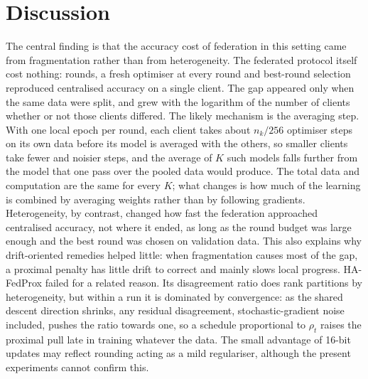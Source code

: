 \section{Discussion}

The central finding is that the accuracy cost of federation in this setting came from fragmentation rather than from
heterogeneity. The federated protocol itself cost nothing: rounds, a fresh optimiser at every round and best-round
selection reproduced centralised accuracy on a single client. The gap appeared only when the same data were split, and
grew with the logarithm of the number of clients whether or not those clients differed. The likely mechanism is the
averaging step. With one local epoch per round, each client takes about $n_k/256$ optimiser steps on its own data
before its model is averaged with the others, so smaller clients take fewer and noisier steps, and the average of $K$
such models falls further from the model that one pass over the pooled data would produce. The total data and
computation are the same for every $K$; what changes is how much of the learning is combined by averaging weights
rather than by following gradients. Heterogeneity, by contrast, changed how fast the federation approached centralised
accuracy, not where it ended, as long as the round budget was large enough and the best round was chosen on
validation data. This also explains why drift-oriented remedies helped little: when fragmentation causes most of the
gap, a proximal penalty has little drift to correct and mainly slows local progress. HA-FedProx failed for a related
reason. Its disagreement ratio does rank partitions by heterogeneity, but within a run it is dominated by convergence:
as the shared descent direction shrinks, any residual disagreement, stochastic-gradient noise included, pushes the ratio
towards one, so a schedule proportional to $\rho_t$ raises the proximal pull late in training whatever the data. The
small advantage of 16-bit updates may reflect rounding acting as a mild regulariser, although the present experiments
cannot confirm this.

